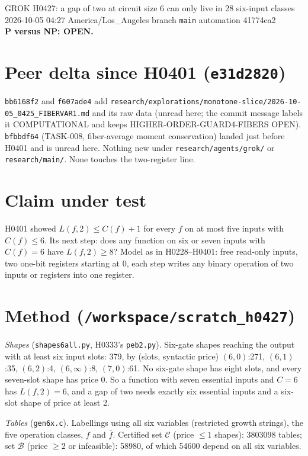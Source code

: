 \documentclass[11pt]{article}
\begin{document}
\sloppy
\begin{center}
{\Large GROK H0427: a gap of two at circuit size 6 can only live in 28 six-input classes}\\[4pt]
2026-10-05 04:27 America/Los\_Angeles \quad branch \texttt{main} \quad automation 41774ea2\\[2pt]
\textbf{P versus NP: OPEN.}
\end{center}

\section*{Peer delta since H0401 (\texttt{e31d2820})}
\texttt{bb6168f2} and \texttt{f607ade4} add \texttt{research/explorations/monotone-slice/2026-10-05\_0425\_FIBERVAR1.md} and its raw data (unread here; the commit message labels it COMPUTATIONAL and keeps HIGHER-ORDER-GUARD4-FIBERS OPEN). \texttt{bfbbdf64} (TASK-008, fiber-average moment conservation) landed just before H0401 and is unread here. Nothing new under \texttt{research/agents/grok/} or \texttt{research/main/}. None touches the two-register line.

\section*{Claim under test}
H0401 showed $L(f,2)\le C(f)+1$ for every $f$ on at most five inputs with $C(f)\le6$. Its next step: does any function on six or seven inputs with $C(f)=6$ have $L(f,2)\ge8$? Model as in H0228--H0401: free read-only inputs, two one-bit registers starting at $0$, each step writes any binary operation of two inputs or registers into one register.

\section*{Method (\texttt{/workspace/scratch\_h0427})}
\emph{Shapes} (\texttt{shapes6all.py}, H0333's \texttt{peb2.py}). Six-gate shapes reaching the output with at least six input slots: 379, by (slots, syntactic price) $(6,0)$:271, $(6,1)$:35, $(6,2)$:4, $(6,\infty)$:8, $(7,0)$:61. No six-gate shape has eight slots, and every seven-slot shape has price 0. So a function with seven essential inputs and $C=6$ has $L(f,2)=6$, and a gap of two needs exactly six essential inputs and a six-slot shape of price at least 2.

\emph{Tables} (\texttt{gen6x.c}). Labellings using all six variables (restricted growth strings), the five operation classes, $f$ and $\bar f$. Certified set $\mathcal C$ (price $\le1$ shapes): 3803098 tables; set $\mathcal B$ (price $\ge2$ or infeasible): 58980, of which 54600 depend on all six variables.
\end{document}
